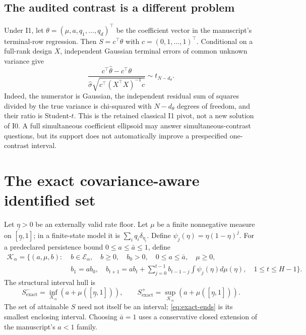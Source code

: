 \documentclass[11pt,a4paper]{article}
\theoremstyle{definition}\newtheorem{definition}[theorem]{Definition}
\theoremstyle{remark}\newtheorem{remark}[theorem]{Remark}
\newcommand{\mc}{\mathcal}
\begin{document}
\subsection{The audited contrast is a different problem}
Under I1, let $\theta=(\mu,a,q_1,\ldots,q_d)^\top$ be the coefficient vector in the manuscript's terminal-row regression. Then $S=c^\top\theta$ with $c=(0,1,\ldots,1)^\top$. Conditional on a full-rank design $X$, independent Gaussian terminal errors of common unknown variance give
\[
 \frac{c^\top\hat\theta-c^\top\theta}
 {\hat\sigma\sqrt{c^\top(X^\top X)^{-1}c}}
 \sim t_{N-d_\theta}.
\]
Indeed, the numerator is Gaussian, the independent residual sum of squares divided by the true variance is chi-squared with $N-d_\theta$ degrees of freedom, and their ratio is Student-$t$. This is the retained classical I1 pivot, not a new solution of I0. A full simultaneous coefficient ellipsoid may answer simultaneous-contrast questions, but its support does not automatically improve a prespecified one-contrast interval.

\section{The exact covariance-aware identified set}
Let $\underline\eta>0$ be an externally valid rate floor. Let $\mu$ be a finite nonnegative measure on $[\underline\eta,1]$; in a finite-state model it is $\sum_iq_i\delta_{\eta_i}$. Define $\psi_j(\eta)=\eta(1-\eta)^j$.
For a predeclared persistence bound $0\le a\le\bar a\le1$, define
\begin{align}
 \mc K_\alpha=\bigg\{(a,\mu,b):\;& b\in\mc E_\alpha,\quad b\ge0,\quad b_0>0,\quad 0\le a\le\bar a,\quad\mu\ge0,\nonumber\\
 &b_1=ab_0,\quad
 b_{t+1}=ab_t+\sum_{j=0}^{t-1}b_{t-1-j}\int\psi_j(\eta)d\mu(\eta),\quad1\le t\le H-1\bigg\}.
 \label{eq:exact-set}
\end{align}
The structural interval hull is
\begin{equation}
 S_{\mathrm{exact}}^- =\inf_{\mc K_\alpha}(a+\mu([\underline\eta,1])),\qquad
 S_{\mathrm{exact}}^+ =\sup_{\mc K_\alpha}(a+\mu([\underline\eta,1])).
 \label{eq:exact-ends}
\end{equation}
The set of attainable $S$ need not itself be an interval; \eqref{eq:exact-ends} is its smallest enclosing interval. Choosing $\bar a=1$ uses a conservative closed extension of the manuscript's $a<1$ family.
\end{document}
